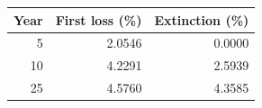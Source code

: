\begin{tabular}{rrr}
\toprule
Year & First loss (\%) & Extinction (\%) \\
\midrule
5 & 2.0546 & 0.0000 \\
10 & 4.2291 & 2.5939 \\
25 & 4.5760 & 4.3585 \\
\bottomrule
\end{tabular}
